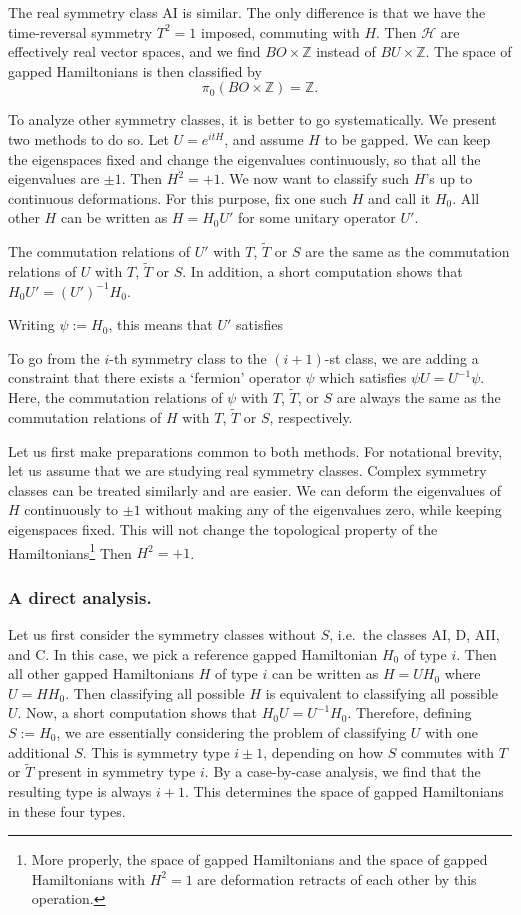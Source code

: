 \documentclass[12pt]{article}
\numberwithin{equation}{section}
\numberwithin{figure}{section}
\theoremstyle{remark}
\def\bZ{\mathbb{Z}}
\def\cH{\mathcal{H}}
\begin{document}
The real symmetry class AI is similar.
The only difference is that we have the time-reversal symmetry $T^2=1$
imposed, commuting with $H$.
Then $\cH$ are effectively real vector spaces, and we find $BO\times \bZ$
instead of $BU\times \bZ$.
The space of gapped Hamiltonians is then classified by \begin{equation}
  \pi_0(BO\times \bZ)=\bZ.
\end{equation}

To analyze other symmetry classes, it is better to go systematically.
We present two methods to do so.
Let $U=e^{itH}$, and assume $H$ to be gapped.
We can keep the eigenspaces fixed and change the eigenvalues continuously,
so that all the eigenvalues are $\pm1$.
Then $H^2=+1$.
We now want to classify such $H$'s up to continuous deformations.
For this purpose, fix one such $H$ and call it $H_0$.
All other $H$ can be written as $H=H_0 U'$ for some unitary operator $U'$.

The commutation relations of $U'$ with $T$, $\tilde T$ or $S$ 
are the same as the commutation relations of $U$ with $T$, $\tilde T$ or $S$. 
In addition, a short computation shows that $H_0 U'=(U')^{-1} H_0$.

Writing $\psi:=H_0$, this means that $U'$ satisfies 

  To go from the $i$-th symmetry class to the $(i+1)$-st class, 
  we are adding a constraint that there exists a `fermion' operator $\psi$ 
  which satisfies $\psi U=U^{-1}\psi$. 
  Here, the commutation relations of $\psi$ with $T$, $\tilde T$, or $S$ 
  are always the same as the commutation relations 
  of $H$ with $T$, $\tilde T$ or $S$, respectively.
\fi

Let us first make preparations common to both methods.
For notational brevity, let us assume that we are studying real symmetry classes.
Complex symmetry classes can be treated similarly and are easier.
We can deform the eigenvalues of $H$ continuously to $\pm1$ without making any of the eigenvalues zero, while keeping eigenspaces fixed.
This will not change the topological property of the Hamiltonians\footnote{%
More properly, the space of gapped Hamiltonians and the space of gapped Hamiltonians with $H^2=1$ are deformation retracts of each other by this operation.
}
Then $H^2=+1$.

\subsubsection{A direct analysis.}
Let us first consider the symmetry classes without $S$, i.e.~the classes AI, D, AII,  and C.
In this case, we pick a reference gapped Hamiltonian $H_0$ of type $i$.
Then all other gapped Hamiltonians $H$ of type $i$ can be written as
$H=UH_0$ where $U=HH_0$. 
Then classifying all possible $H$ is equivalent to classifying all possible $U$.
Now, a short computation shows that $H_0U=U^{-1}H_0$.
Therefore, defining $S:=H_0$, we are essentially considering the problem of
classifying $U$ with one additional $S$.
This is symmetry type $i\pm1$, depending on how $S$ commutes with $T$ or $\tilde T$ present in symmetry type $i$.
By a case-by-case analysis, we find that the resulting type is always $i+1$.
This determines the space of gapped Hamiltonians in these four types.
\end{document}
